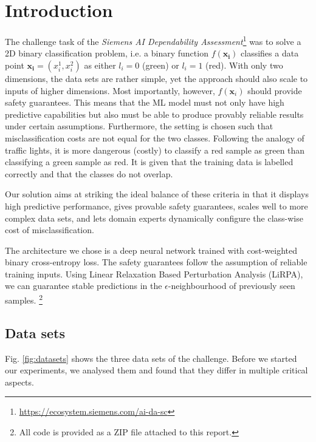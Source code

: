 \documentclass[acmsmall,nonacm]{acmart}
\begin{document}
\section{Introduction}

The challenge task of the \textit{Siemens AI Dependability Assessment}\footnote{\url{https://ecosystem.siemens.com/ai-da-sc}} was to solve a 2D binary classification problem, i.e. a binary function $f(\mathbf{x_i})$ classifies a data point $\mathbf{x_i} = (x_i^1, x_i^2)$ as either $l_i=0$ (green) or $l_i=1$ (red). With only two dimensions, the data sets are rather simple, yet the approach should also scale to inputs of higher dimensions. Most importantly, however, $f(\mathbf{x}_i)$ should provide safety guarantees. This means that the ML model must not only have high predictive capabilities but also must be able to produce provably reliable results under certain assumptions. Furthermore, the setting is chosen such that misclassification costs are not equal for the two classes. Following the analogy of traffic lights, it is more dangerous (costly) to classify a red sample as green than classifying a green sample as red. It is given that the training data is labelled correctly and that the classes do not overlap.  

Our solution aims at striking the ideal balance of these criteria in that it displays high predictive performance, gives provable safety guarantees, scales well to more complex data sets, and lets domain experts dynamically configure the class-wise cost of misclassification.

The architecture we chose is a deep neural network trained with cost-weighted binary cross-entropy loss. The safety guarantees follow the assumption of reliable training inputs. Using Linear Relaxation Based Perturbation Analysis (LiRPA), we can guarantee stable predictions in the $\epsilon$-neighbourhood of previously seen samples. \footnote{All code is provided as a ZIP file attached to this report.}

\subsection{Data sets}

Fig. \ref{fig:datasets} shows the three data sets of the challenge. Before we started our experiments, we analysed them and found that they differ in multiple critical aspects. 
\end{document}
